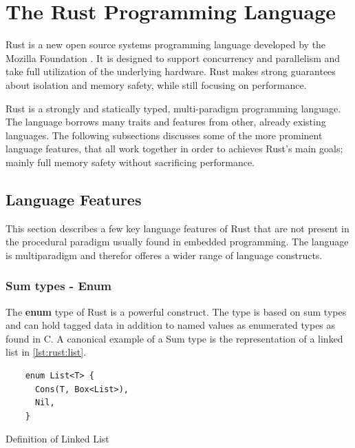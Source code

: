 
\section{The Rust Programming Language} %
\label{sub:the_rust_programming_language}

Rust \cite{web:rust_lang} is a new open source systems programming language developed by the Mozilla Foundation \cite{web:mozilla_foundation}.
It is designed to support concurrency and parallelism and take full utilization of the underlying hardware.
Rust makes strong guarantees about isolation and memory safety, while still focusing on performance.

Rust is a strongly and statically typed, multi-paradigm programming language.
The language borrows many traits and features from other, already existing languages.
The following subsections discusses some of the more prominent language features, that all work together in order to achieves Rust's main goals; mainly full memory safety without sacrificing performance.

\subsection{Language Features}
\label{ssub:rust:features}

This section describes a few key language features of Rust that are not present in the procedural paradigm usually found in embedded programming.
The language is multiparadigm and therefor offeres a wider range of language constructs.

\subsubsection{Sum types - Enum}

The \textbf{enum} type of Rust is a powerful construct.
The type is based on sum types and can hold tagged data in addition to named values as enumerated types as found in C.
A canonical example of a Sum type is the representation of a linked list in \autoref{lst:rust:list}.

\begin{listing}[H]
  \begin{verbatim}
    enum List<T> {
      Cons(T, Box<List>),
      Nil,
    }
  \end{verbatim}
  \caption{Definition of Linked List}
  \label{lst:rust:list}
\end{listing}


